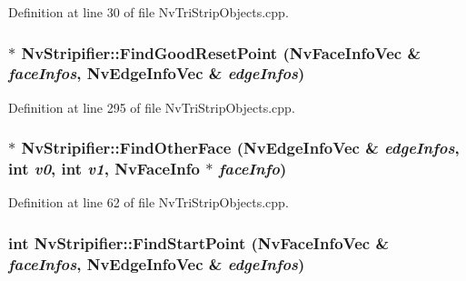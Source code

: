 Definition at line 30 of file NvTriStripObjects.cpp.\hypertarget{class_nv_stripifier_1719480e83ed6a6f76b690d851dbf29f}{
\subsubsection[{FindGoodResetPoint}]{ $\ast$ NvStripifier::FindGoodResetPoint ({\bf NvFaceInfoVec} \& {\em faceInfos}, \/  {\bf NvEdgeInfoVec} \& {\em edgeInfos})}}
\label{class_nv_stripifier_1719480e83ed6a6f76b690d851dbf29f}




Definition at line 295 of file NvTriStripObjects.cpp.\hypertarget{class_nv_stripifier_0f2a262590bf7bbfbf37d9fc720dd4ef}{
\subsubsection[{FindOtherFace}]{ $\ast$ NvStripifier::FindOtherFace ({\bf NvEdgeInfoVec} \& {\em edgeInfos}, \/  int {\em v0}, \/  int {\em v1}, \/  {\bf NvFaceInfo} $\ast$ {\em faceInfo})}}
\label{class_nv_stripifier_0f2a262590bf7bbfbf37d9fc720dd4ef}




Definition at line 62 of file NvTriStripObjects.cpp.\hypertarget{class_nv_stripifier_07e511a48d634c1630aece77953331d5}{
\subsubsection[{FindStartPoint}]{\setlength{\rightskip}{0pt plus 5cm}int NvStripifier::FindStartPoint ({\bf NvFaceInfoVec} \& {\em faceInfos}, \/  {\bf NvEdgeInfoVec} \& {\em edgeInfos})}}
\label{class_nv_stripifier_07e511a48d634c1630aece77953331d5}




